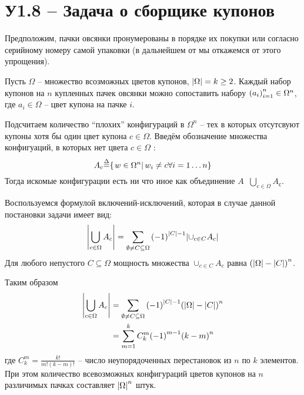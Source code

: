 \documentclass[a4paper]{article}
\title{\rus{Домашняя работа по курсу \\ ``Теоретико-вероятностные методы в статистике''}}
\author{\rus{Назаров Иван,} \rus{101мНОД(ИССА)}}
\let\originalleft\left
\let\originalright\right
\renewcommand{\left}{\mathopen{}\mathclose\bgroup\originalleft}
\renewcommand{\right}{\aftergroup\egroup\originalright}
\newcommand{\obj}[1]{{\left\{ #1 \right \}}}
\newcommand{\brac}[1]{{\left ( #1 \right )}}
\newcommand{\induc}[1]{{\left . #1 \right \vert}}
\newcommand{\abs}[1]{{\left | #1 \right |}}
\newcommand{\defn}{{\mathop{\overset{\Delta}{=}}\nolimits}}
\begin{document}
\maketitle

\section{У1.8 -- Задача о сборщике купонов} %
\label{sec:task_1_8}

Предположим, пачки овсянки пронумерованы в порядке их покупки или согласно
серийному номеру самой упаковки (в дальнейшем от мы откажемся от этого упрощения).

Пусть $\Omega$ -- множество всозможных цветов купонов, $\abs{\Omega} = k \geq 2$.
Каждый набор купонов на $n$ купленных пачек овсянки можно сопоставить набору
$\brac{a_i}_{i=1}^n \in \Omega^n$, где $a_i\in \Omega$ -- цвет купона на пачке $i$.

Подсчитаем количество ``плохих'' конфигураций в $\Omega^n$ -- тех в которых
отсутсвуют купоны хотя бы один цвет купона $c\in\Omega$.
Введём обозначение множества конфигуаций, в которых нет цвета $c\in \Omega$ :
\[A_c \defn \obj{\induc{w\in \Omega^n}\, w_i \neq c \forall i = 1\ldots n }\]
Тогда искомые конфигурации есть ни что иное как объединение $A \defn \bigcup_{c\in \Omega} A_с$.

Воспользуемся формулой включений-исключений, которая в случае данной постановки
задачи имеет вид:
\[\abs{ \bigcup_{c\in \Omega} A_c } = \sum_{\emptyset \neq C\subseteq \Omega}
\brac{-1}^{\abs{C} - 1} \abs{\cup_{c\in C} A_c} \]
Для любого непустого $C\subseteq \Omega$ мощность множества $\cup_{c\in C} A_c$
равна $\brac{\abs{\Omega} - \abs{C}}^n$.

Таким образом \begin{align*}
	\abs{ \bigcup_{c\in \Omega} A_c } &= \sum_{\emptyset \neq C\subseteq \Omega}
		\brac{-1}^{\abs{C} - 1} \brac{\abs{\Omega} - \abs{C}}^n \\
		&= \sum_{m=1}^k C^m_k {(-1)}^{m-1} {(k - m)}^n
\end{align*}
где $C^m_k = \frac{k!}{m!(k-m)!}$ -- число неупорядоченных перестановок из $n$ по $k$ элементов.
При этом количество всевозможных конфигураций цветов купонов на $n$ различимых
пачках составляет $\abs{\Omega}^n$ штук.
\end{document}
